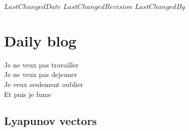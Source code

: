 \ifsvnmulti
 {$LastChangedDate$}
 {$LastChangedRevision$} {$LastChangedBy$}
\fi

\chapter{Daily blog}
\label{c-DailyBlog}

\begin{bartlett}{
Je ne veux pas travailler\\
Je ne veux pas dejeuner\\
Je veux seulement oublier\\
Et puis je fume
            }
\end{bartlett}

\renewcommand{\ssp}{x}
\renewcommand{\vel}{\ensuremath{v}}   %

\section{Lyapunov vectors \KS}

